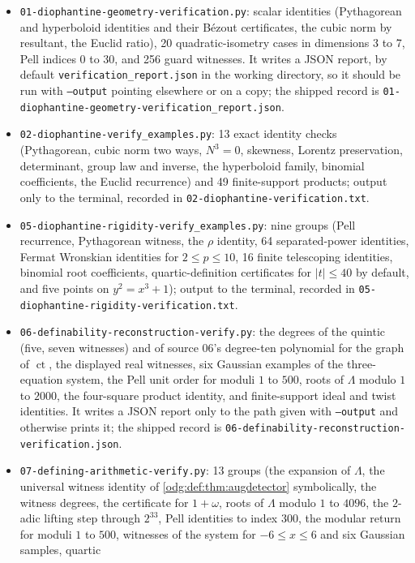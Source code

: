 \documentclass[11pt,oneside]{article}
\numberwithin{equation}{section}
\theoremstyle{definition}
\theoremstyle{remark}
\newcommand{\ct}{\operatorname{ct}}
\newcommand{\fn}[1]{\nolinkurl{#1}}
\begin{document}
\begin{itemize}[leftmargin=*]
\item \fn{01-diophantine-geometry-verification.py}: scalar identities
(Pythagorean and hyperboloid identities and their B\'ezout certificates,
the cubic norm by resultant, the Euclid ratio), 20 quadratic-isometry cases in
dimensions 3 to 7, Pell indices 0 to 30, and 256 guard witnesses. It writes a
JSON report, by default \fn{verification_report.json} in the working
directory, so it should be run with \texttt{--output} pointing elsewhere or
on a copy; the shipped record is
\fn{01-diophantine-geometry-verification_report.json}.
\item \fn{02-diophantine-verify_examples.py}: 13 exact identity checks
(Pythagorean, cubic norm two ways, $N^3=0$, skewness, Lorentz preservation,
determinant, group law and inverse, the hyperboloid family, binomial
coefficients, the Euclid recurrence) and 49 finite-support products; output
only to the terminal, recorded in \fn{02-diophantine-verification.txt}.
\item \fn{05-diophantine-rigidity-verify_examples.py}: nine groups (Pell
recurrence, Pythagorean witness, the $\rho$ identity, 64 separated-power
identities, Fermat Wronskian identities for $2\le p\le10$, 16 finite
telescoping identities, binomial root coefficients, quartic-definition
certificates for $|t|\le40$ by default, and five points on $y^2=x^3+1$);
output to the terminal, recorded in
\fn{05-diophantine-rigidity-verification.txt}.
\item \fn{06-definability-reconstruction-verify.py}: the degrees of the
quintic (five, seven witnesses) and of source 06's degree-ten polynomial for
the graph of $\ct$, the displayed real witnesses, six Gaussian examples of the
three-equation system, the Pell unit order for moduli $1$ to $500$, roots of
$\Lambda$ modulo $1$ to $2000$, the four-square product identity, and
finite-support ideal and twist identities. It writes a JSON report only to
the path given with \texttt{--output} and otherwise prints it; the shipped
record is \fn{06-definability-reconstruction-verification.json}.
\item \fn{07-defining-arithmetic-verify.py}: 13 groups (the expansion of
$\Lambda$, the universal witness identity of \cref{odg:def:thm:augdetector}
symbolically, the witness degrees, the certificate for $1+\omega$, roots of
$\Lambda$ modulo $1$ to $4096$, the $2$-adic lifting step through $2^{33}$,
Pell identities to index $300$, the modular return for moduli $1$ to $500$,
witnesses of the system for $-6\le x\le6$ and six Gaussian samples, quartic

\end{itemize}
\end{document}
